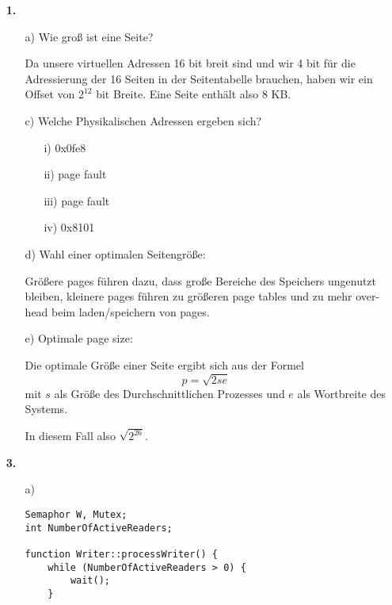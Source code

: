 \documentclass[a4paper,11pt]{article}
\author{\authorinfo}
\title{\titleinfo}
\date{\today}
\begin{document}
\maketitle


\begin{enumerate}
\item[\textbf{1.}]

\begin{itemize}
    \item[a)] Wie groß ist eine Seite?

    Da unsere virtuellen Adressen 16 bit breit sind und wir 4 bit für die
    Adressierung der 16 Seiten in der Seitentabelle brauchen, haben wir ein
    Offset von \(2^{12}\) bit Breite.  Eine Seite enthält also 8 KB.

    \item[c)] Welche Physikalischen Adressen ergeben sich?
    \begin{enumerate}
        \item[i)] 0x0fe8
        \item[ii)] page fault
        \item[iii)] page fault
        \item[iv)] 0x8101
    \end{enumerate}

    \item[d)] Wahl einer optimalen Seitengröße:

    Größere pages führen dazu, dass große Bereiche des Speichers ungenutzt
    bleiben, kleinere pages führen zu größeren page tables und zu mehr over-
    head beim laden/speichern von pages.

    \item[e)] Optimale page size:

    Die optimale Größe einer Seite ergibt sich aus der Formel
    \[
        p = \sqrt{2 s e}
    \]
    mit \(s\) als Größe des Durchschnittlichen Prozesses und \(e\) als
    Wortbreite des Systems.

    In diesem Fall also \(\sqrt{2^{26}}\).
\end{itemize}

\item[\textbf{3.}]
\begin{itemize}
    \item[a)]
        \begin{verbatim}
Semaphor W, Mutex;
int NumberOfActiveReaders;

function Writer::processWriter() {
    while (NumberOfActiveReaders > 0) {
        wait();
    }


\end{verbatim}
\end{itemize}
\end{enumerate}
\end{document}
